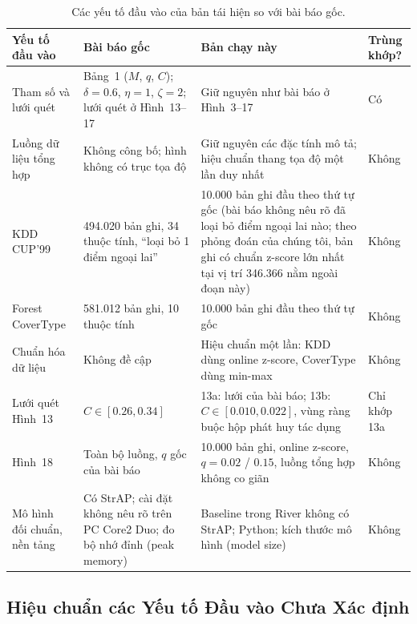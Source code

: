 \begin{table}[!ht]
\centering
\caption{Các yếu tố đầu vào của bản tái hiện so với bài báo gốc.}
\label{tab:svstream_inputs}
\footnotesize
\begin{tabularx}{\textwidth}{@{}l L L l@{}}
\toprule
\textbf{Yếu tố đầu vào} & \textbf{Bài báo gốc} & \textbf{Bản chạy này} & \textbf{Trùng khớp?} \\
\midrule
Tham số và lưới quét & Bảng~1 ($M$, $q$, $C$); $\delta=0.6$, $\eta=1$, $\zeta=2$; lưới quét ở Hình~13--17 & Giữ nguyên như bài báo ở Hình~3--17 & Có \\
Luồng dữ liệu tổng hợp & Không công bố; hình không có trục tọa độ & Giữ nguyên các đặc tính mô tả; hiệu chuẩn thang tọa độ một lần duy nhất & Không \\
KDD CUP'99 & 494.020 bản ghi, 34 thuộc tính, ``loại bỏ 1 điểm ngoại lai'' & 10.000 bản ghi đầu theo thứ tự gốc (bài báo không nêu rõ đã loại bỏ điểm ngoại lai nào; theo phỏng đoán của chúng tôi, bản ghi có chuẩn z-score lớn nhất tại vị trí 346.366 nằm ngoài đoạn này) & Không \\
Forest CoverType & 581.012 bản ghi, 10 thuộc tính & 10.000 bản ghi đầu theo thứ tự gốc & Không \\
Chuẩn hóa dữ liệu & Không đề cập & Hiệu chuẩn một lần: KDD dùng online z-score, CoverType dùng min-max & Không \\
Lưới quét Hình~13 & $C \in [0.26, 0.34]$ & 13a: lưới của bài báo; 13b: $C \in [0.010, 0.022]$, vùng ràng buộc hộp phát huy tác dụng & Chỉ khớp 13a \\
Hình~18 & Toàn bộ luồng, $q$ gốc của bài báo & 10.000 bản ghi, online z-score, $q=0.02$ / $0.15$, luồng tổng hợp không co giãn & Không \\
Mô hình đối chuẩn, nền tảng & Có StrAP; cài đặt không nêu rõ trên PC Core2 Duo; đo bộ nhớ đỉnh (peak memory) & Baseline trong River không có StrAP; Python; kích thước mô hình (model size) & Không \\
\bottomrule
\end{tabularx}
\end{table}

\subsection{Hiệu chuẩn các Yếu tố Đầu vào Chưa Xác định}
\label{subsec:svstream_calibration}

